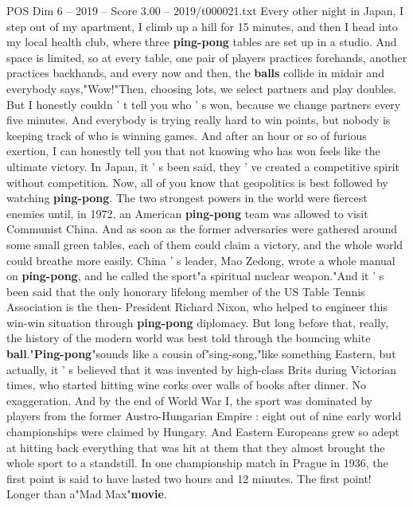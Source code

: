 \begin{textsample}{POS Dim 6 – 2019 – Score 3.00 – 2019/t000021.txt}  \label{ex:f6_pos_065}
Every other night in Japan, I step out of my apartment, I climb up a hill for 15 minutes, and then I head into my local health club, where three \textbf{ping-pong} tables are set up in a studio.
And space is limited, so at every table, one pair of players practices forehands, another practices backhands, and every now and then, the \textbf{balls} collide in midair and everybody says,"Wow!"Then, choosing lots, we select partners and play doubles.
But I honestly couldn ' t tell you who ' s won, because we change partners every five minutes.
And everybody is trying really hard to win points, but nobody is keeping track of who is winning games.
And after an hour or so of furious exertion, I can honestly tell you that not knowing who has won feels like the ultimate victory.
In Japan, it ' s been said, they ' ve created a competitive spirit without competition.
Now, all of you know that geopolitics is best followed by watching \textbf{ping-pong}.
The two strongest powers in the world were fiercest enemies until, in 1972, an American \textbf{ping-pong} team was allowed to visit Communist China.
And as soon as the former adversaries were gathered around some small green tables, each of them could claim a victory, and the whole world could breathe more easily.
China ' s leader, Mao Zedong, wrote a whole manual on \textbf{ping-pong}, and he called the sport"a spiritual nuclear weapon."And it ' s been said that the only honorary lifelong member of the US Table Tennis Association is the then- President Richard Nixon, who helped to engineer this win-win situation through \textbf{ping-pong} diplomacy.
But long before that, really, the history of the modern world was best told through the bouncing white \textbf{ball}."\textbf{Ping-pong}"sounds like a cousin of"sing-song,"like something Eastern, but actually, it ' s believed that it was invented by high-class Brits during Victorian times, who started hitting wine corks over walls of books after dinner.
No exaggeration.
And by the end of World War I, the sport was dominated by players from the former Austro-Hungarian Empire : eight out of nine early world championships were claimed by Hungary.
And Eastern Europeans grew so adept at hitting back everything that was hit at them that they almost brought the whole sport to a standstill.
In one championship match in Prague in 1936, the first point is said to have lasted two hours and 12 minutes.
The first point!
Longer than a"Mad Max"\textbf{movie}.

\end{textsample}

